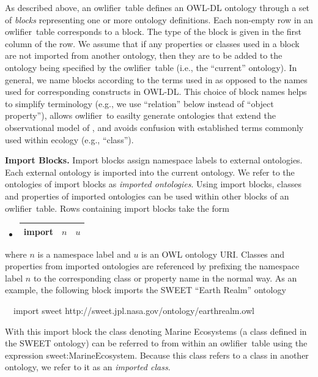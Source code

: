 \documentclass[preprint,number]{elsarticle}
\newcommand{\owlifier}{\textsf{owlifier}}
\newcommand{\myblock}[1]{\vspace{12pt}\noindent\textbf{#1}}
\begin{document}
As described above, an \owlifier\ table defines an OWL-DL
\cite{smith04:_owl_web_ontol_languag_guide} ontology through a set of
\emph{blocks} representing one or more ontology definitions.  Each
non-empty row in an \owlifier\ table corresponds to a block. The type
of the block is given in the first column of the row. 
We assume that if any properties or classes used in a block are not
imported from another ontology, then they are to be added to the
ontology being specified by the \owlifier\ table (i.e., the
``current'' ontology). In general, we name blocks according to the
terms used in
\cite{bowers08:_concep_model_framew_for_expres,madin07:_ontol_for_descr_and_synth}
as opposed to the names used for corresponding constructs in
OWL-DL. This choice of block names helps to simplify terminology
(e.g., we use ``relation'' below instead of ``object property''),
allows \owlifier\ to easilty generate ontologies that extend the
observational model of
\cite{bowers08:_concep_model_framew_for_expres,madin07:_ontol_for_descr_and_synth},
and avoids confusion with established terms commonly used within
ecology (e.g., ``class''). 

\myblock{Import Blocks.} Import blocks assign namespace labels to
external ontologies. Each external ontology is imported into the
current ontology. We refer to the ontologies of import blocks as
\emph{imported ontologies}.  Using import blocks, classes and
properties of imported ontologies can be used within other blocks of
an \owlifier\ table.  Rows containing import blocks take the form
\begin{itemize}
\item[]
  \begin{tabular}{|l|l|l|}\hline
    \textsf{import} & $n$ & $u$ \\ \hline 
  \end{tabular} 
\end{itemize}
where $n$ is a namespace label and $u$ is an OWL ontology URI. Classes
and properties from imported ontologies are referenced by prefixing
the namespace label $n$ to the corresponding class or property name in
the normal way. As an example, the following block imports the SWEET
``Earth Realm'' ontology \cite{raskin:_seman_web_for_earth_and}
\begin{tabbing}
  ~~\textsf{import}  \textsf{sweet} 
  \textsf{http://sweet.jpl.nasa.gov/ontology/earthrealm.owl}
\end{tabbing}
With this import block the class denoting Marine Ecosystems (a class
defined in the SWEET ontology) can be referred to from within an
\owlifier\ table using the expression
\textsf{sweet:MarineEcosystem}. Because this class refers to a class
in another ontology, we refer to it as an \emph{imported class}.
\end{document}
